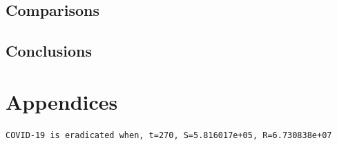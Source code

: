 \documentclass[11pt]{article}
\begin{document}
\subsection{Comparisons}
\subsection{Conclusions}
\newpage


\section{Appendices}



\begin{verbatim}
COVID-19 is eradicated when, t=270, S=5.816017e+05, R=6.730838e+07
\end{verbatim}
\end{document}
